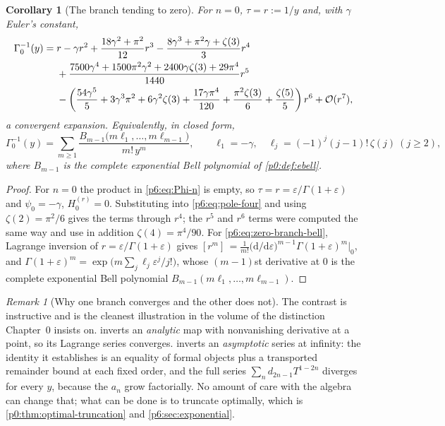 \documentclass[11pt,a4paper,oneside]{book}
\theoremstyle{plain}
\newtheorem{corollary}[theorem]{Corollary}
\theoremstyle{definition}
\theoremstyle{remark}
\newtheorem{remark}[theorem]{Remark}
\newcommand{\dd}{\mathrm{d}}
\newcommand{\Coef}[1]{[#1]\,}
\newcommand{\bigO}{\mathcal{O}}
\newcommand{\EB}{B}
\begin{document}
\begin{corollary}[The branch tending to zero]\label{p6:cor:zero-branch}
For $n=0$, $\tau=r:=1/y$ and, with $\gamma$ Euler's constant,
\begin{align}
 \Gamma_0^{-1}(y)={}&r-\gamma r^{2}
 +\frac{18\gamma^{2}+\pi^{2}}{12}r^{3}
 -\frac{8\gamma^{3}+\pi^{2}\gamma+\zeta(3)}3r^{4}
 \notag\\
 &+\frac{7500\gamma^{4}+1500\pi^{2}\gamma^{2}+2400\gamma\zeta(3)
 +29\pi^{4}}{1440}r^{5}
 \notag\\
 &-\left(\frac{54\gamma^{5}}5+3\gamma^{3}\pi^{2}+6\gamma^{2}\zeta(3)
 +\frac{17\gamma\pi^{4}}{120}+\frac{\pi^{2}\zeta(3)}6
 +\frac{\zeta(5)}5\right)r^{6}+\bigO(r^{7}),
 \label{p6:eq:zero-branch}
\end{align}
a convergent expansion.  Equivalently, in closed form,
\begin{equation}\label{p6:eq:zero-branch-bell}
 \Gamma_0^{-1}(y)=\sum_{m\ge1}\frac{\EB_{m-1}
 \bigl(m\ell_1,\dots,m\ell_{m-1}\bigr)}{m!\,y^{m}},
 \qquad
 \ell_1=-\gamma,\quad \ell_j=(-1)^{j}(j-1)!\,\zeta(j)\ (j\ge2),
\end{equation}
where $\EB_{m-1}$ is the complete exponential Bell polynomial of
\cref{p0:def:ebell}.
\end{corollary}

\begin{proof}
For $n=0$ the product in \eqref{p6:eq:Phi-n} is empty, so
$\tau=r=\varepsilon/\Gamma(1+\varepsilon)$ and $\psi_0=-\gamma$,
$H_0^{(r)}=0$.  Substituting into \eqref{p6:eq:pole-four} and using
$\zeta(2)=\pi^{2}/6$ gives the terms through $r^{4}$; the $r^{5}$ and $r^{6}$
terms were computed the same way and use in addition $\zeta(4)=\pi^{4}/90$.
For \eqref{p6:eq:zero-branch-bell}, Lagrange inversion of
$r=\varepsilon/\Gamma(1+\varepsilon)$ gives
$\Coef{r^{m}}=\tfrac1{m!}\bigl(\dd/\dd\varepsilon\bigr)^{m-1}
\Gamma(1+\varepsilon)^{m}\big|_{0}$, and
$\Gamma(1+\varepsilon)^{m}=\exp\bigl(m\sum_j\ell_j\varepsilon^{j}/j!\bigr)$,
whose $(m-1)$st derivative at $0$ is the complete exponential Bell polynomial
$\EB_{m-1}(m\ell_1,\dots,m\ell_{m-1})$.
\end{proof}

\begin{remark}[Why one branch converges and the other does not]
\label{p6:rem:convergence-contrast}
The contrast is instructive and is the cleanest illustration in the volume of
the distinction Chapter~0 insists on.   inverts an
\emph{analytic} map with nonvanishing derivative at a point, so its Lagrange
series converges.   inverts an \emph{asymptotic} series at
infinity: the identity it establishes is an equality of formal objects plus a
transported remainder bound at each fixed order, and the full series
$\sum_nd_{2n-1}T^{1-2n}$ diverges for every $y$, because the $a_n$ grow
factorially.  No amount of care with the algebra can change that; what can be
done is to truncate optimally, which is \cref{p0:thm:optimal-truncation} and
\cref{p6:sec:exponential}.
\end{remark}
\end{document}
